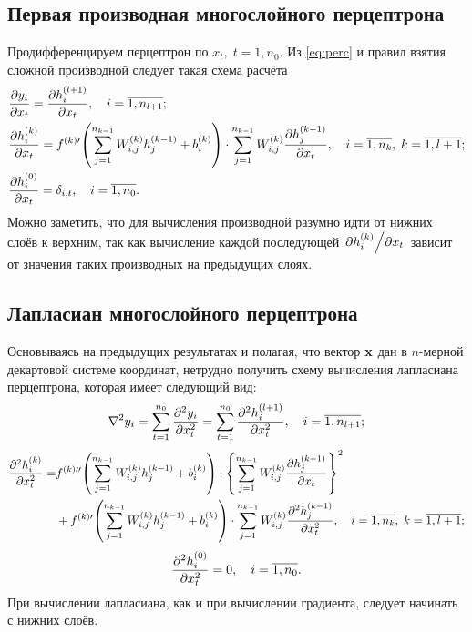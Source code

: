 \documentclass[11pt]{article}
\numberwithin{equation}{section}
\begin{document}
\subsection{Первая производная многослойного перцептрона}

Продифференцируем перцептрон по $x_t,\; t=\overline{1,n_0}$. Из \eqref{eq:perc} и правил взятия сложной производной следует такая схема расчёта
\begin{equation}
    \begin{split}
        &\pdv{y_i}{x_t} = \pdv{h^{(l+1)}_i}{x_t},\quad i=\overline{1,n_{l+1}};        
        \\
        & \pdv{h^{(k)}_i}{x_t} = f^{(k)\prime}\qty(\sum_{j=1}^{n_{k-1}} W^{(k)}_{i,j} h^{(k-1)}_j + b^{(k)}_i) \cdot \sum_{j=1}^{n_{k-1}} W^{(k)}_{i,j} \pdv{h^{(k-1)}_j}{x_t},\quad i=\overline{1,n_k},\; k = \overline{1, l+1};\\
        & \pdv{h^{(0)}_i}{x_t} = \delta_{i,t},\quad i=\overline{1,n_0}.
    \end{split}
\end{equation}
Можно заметить, что для вычисления производной разумно идти от нижних слоёв к верхним, так как вычисление каждой последующей $\pdv*{h^{(k)}_i}{x_t}$ зависит от значения таких производных на предыдущих слоях.

\subsection{Лапласиан многослойного перцептрона}

Основываясь на предыдущих результатах и полагая, что вектор $\vb{x}$ дан в $n$-мерной декартовой системе координат, нетрудно получить схему вычисления лапласиана перцептрона, которая имеет следующий вид:
\begin{equation}
    \laplacian y_i = \sum_{t=1}^{n_0} \pdv[2]{y_i}{x_t} = \sum_{t=1}^{n_0}\pdv[2]{h^{(l+1)}_i}{x_t},\quad i=\overline{1,n_{l+1}};
\end{equation}
\begin{equation}
    \begin{split}
        \pdv[2]{h^{(k)}_i}{x_t} = & f^{(k)\prime\prime}\qty(\sum_{j=1}^{n_{k-1}} W^{(k)}_{i,j} h^{(k-1)}_j + b^{(k)}_i) \cdot \qty{\sum_{j=1}^{n_{k-1}} W^{(k)}_{i,j} \pdv{h^{(k-1)}_j}{x_t}}^2\\
        &+ f^{(k)\prime}\qty(\sum_{j=1}^{n_{k-1}} W^{(k)}_{i,j} h^{(k-1)}_j + b^{(k)}_i) \cdot \sum_{j=1}^{n_{k-1}} W^{(k)}_{i,j} \pdv[2]{h^{(k-1)}_j}{x_t},\quad i=\overline{1,n_k},\; k = \overline{1, l+1};
    \end{split}
\end{equation}
\begin{equation}
    \pdv[2]{h^{(0)}_i}{x_t} = 0,\quad i=\overline{1,n_0}.
\end{equation}
При вычислении лапласиана, как и при вычислении градиента, следует начинать с нижних слоёв.
\end{document}
